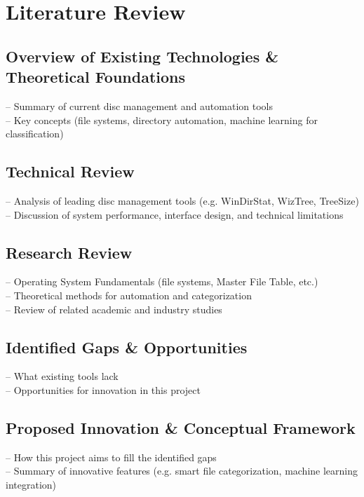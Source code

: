 \section{Literature Review}

\subsection{Overview of Existing Technologies \& Theoretical Foundations}
– Summary of current disc management and automation tools\\
– Key concepts (file systems, directory automation, machine learning for classification)
\subsection{Technical Review}
– Analysis of leading disc management tools (e.g. WinDirStat, WizTree, TreeSize)\\
– Discussion of system performance, interface design, and technical limitations
\subsection{Research Review}
– Operating System Fundamentals (file systems, Master File Table, etc.)\\
– Theoretical methods for automation and categorization\\
– Review of related academic and industry studies
\subsection{Identified Gaps \& Opportunities}
– What existing tools lack\\
– Opportunities for innovation in this project
\subsection{Proposed Innovation \& Conceptual Framework}
– How this project aims to fill the identified gaps\\
– Summary of innovative features (e.g. smart file categorization, machine learning integration)